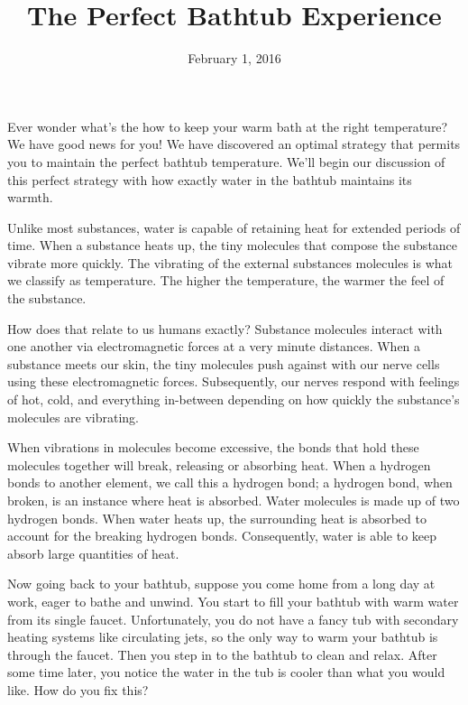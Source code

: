 \documentclass[10pt]{article}
\title{The Perfect Bathtub Experience}
\date{February 1, 2016}
\begin{document}
\maketitle

    Ever wonder what's the how to keep your warm bath at the right temperature? We have good news for you! We have discovered an optimal strategy that permits you to maintain the perfect bathtub temperature. We'll begin our discussion of this perfect strategy with how exactly water in the bathtub maintains its warmth.

	Unlike most substances, water is capable of retaining heat for extended periods of time. When a substance heats up, the tiny molecules that compose the substance vibrate more quickly. The vibrating of the external substances molecules is what we classify as temperature. The higher the temperature, the warmer the feel of the substance. 
	
	How does that relate to us humans exactly? Substance molecules interact with one another via electromagnetic forces at a very minute distances. When a substance meets our skin, the tiny molecules push against with our nerve cells using these electromagnetic forces. Subsequently, our nerves respond with feelings of hot, cold, and everything in-between depending on how quickly the substance's molecules are vibrating.
	
	When vibrations in molecules become excessive, the bonds that hold these molecules together will break, releasing or absorbing heat. When a hydrogen bonds to another element, we call this a hydrogen bond; a hydrogen bond, when broken, is an instance where heat is absorbed. Water molecules is made up of two hydrogen bonds. When water heats up, the surrounding heat is absorbed to account for the breaking hydrogen bonds. Consequently, water is able to keep absorb large quantities of heat. 
	
	Now going back to your bathtub, suppose you come home from a long day at work, eager to bathe and unwind. You start to fill your bathtub with warm water from its single faucet. Unfortunately, you do not have a fancy tub with secondary heating systems like circulating jets, so the only way to warm your bathtub is through the faucet. Then you step in to the bathtub to clean and relax. After some time later, you notice the water in the tub is cooler than what you would like. How do you fix this?
\end{document}
